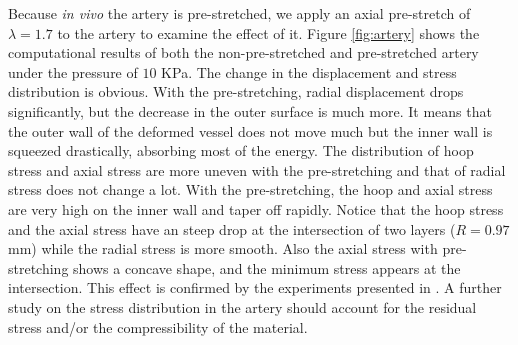 Because \emph{in vivo} the artery is pre-stretched, we apply an axial pre-stretch of $\lambda = 1.7$ to the artery to examine the effect of it. Figure \ref{fig:artery} shows the computational results of both the non-pre-stretched and pre-stretched artery under the pressure of $10$ KPa. The change in the displacement and stress distribution is obvious. With the pre-stretching, radial displacement drops significantly, but the decrease in the outer surface is much more. It means that the outer wall of the deformed vessel does not move much but the inner wall is squeezed drastically, absorbing most of the energy. The distribution of hoop stress and axial stress are more uneven with the pre-stretching and that of radial stress does not change a lot. With the pre-stretching, the hoop and axial stress are very high on the inner wall and taper off rapidly. Notice that the hoop stress and the axial stress have an steep drop at the intersection of two layers ($R = 0.97$ mm) while the radial stress is more smooth. Also the axial stress with pre-stretching shows a concave shape, and the minimum stress appears at the intersection. This effect is confirmed by the experiments presented in \cite{Keitzer}. A further study on the stress distribution in the artery should account for the residual stress and/or the compressibility of the material.


